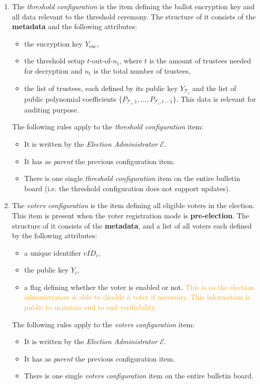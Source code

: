 \begin{enumerate}
    \item 
        The \textit{threshold configuration} is the item defining the ballot encryption key and all data relevant to the threshold ceremony. The structure of it consists of the \textbf{metadata} and the following attributes:
        \begin{itemize}
            \item the encryption key $Y_\mathrm{enc}$,
            \item the threshold setup $t$-out-of-$n_\mathrm{t}$, where $t$ is the amount of trustees needed for decryption and $n_\mathrm{t}$ is the total number of trustees,
            \item the list of trustees, each defined by its public key $Y_{\mathcal{T}_i}$ and the list of public polynomial coefficients $\{P_{\mathcal{T}_i,1}, ..., P_{\mathcal{T}_i,t-1}\}$. This data is relevant for auditing purpose.
        \end{itemize}
        The following rules apply to the \textit{threshold configuration} item:
            \begin{itemize}
                \item It is written by the \textit{Election Administrator} $\mathcal{E}$.
                \item It has as \textit{parent} the previous configuration item.
                \item There is one single \textit{threshold configuration} item on the entire bulletin board (i.e. the threshold configuration does not support updates).
            \end{itemize}
    
    \item 
        The \textit{voters configuration} is the item defining all eligible voters in the election. This item is present when the voter registration mode is \textbf{pre-election}. The structure of it consists of the \textbf{metadata}, and a list of all voters each defined by the following attributes:
        \begin{itemize}
            \item a unique identifier $vID_i$,
            \item the public key $Y_i$,
            \item a flag defining whether the voter is enabled or not. \textcolor{orange}{This is so the election administrators is able to disable a voter if necessary. This information is public to maintain end to end verifiability.}
        \end{itemize}
        The following rules apply to the \textit{voters configuration} item:
        \begin{itemize}
            \item It is written by the \textit{Election Administrator} $\mathcal{E}$.
            \item It has as \textit{parent} the previous configuration item.
            \item There is one single \textit{voters configuration} item on the entire bulletin board.
        \end{itemize}
    

\end{enumerate}
